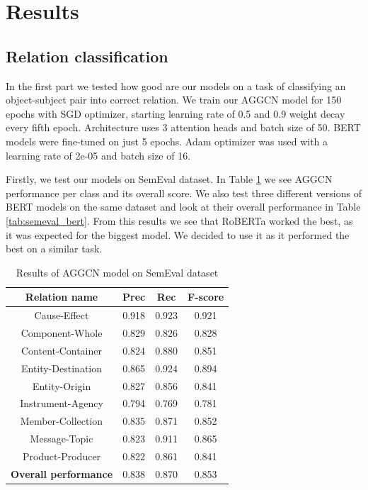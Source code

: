 \documentclass[fleqn,moreauthors,10pt]{ds_report}
\begin{document}

\section{Results}

\subsection{Relation classification}
\par In the first part we tested how good are our models on a task of classifying an object-subject pair into correct relation. We train our AGGCN model for 150 epochs with SGD optimizer, starting learning rate of 0.5 and 0.9 weight decay every fifth epoch. Architecture uses 3 attention heads and batch size of 50. BERT models were fine-tuned on just 5 epochs. Adam optimizer was used with a learning rate of 2e-05 and batch size of 16. 

\par Firstly, we test our models on SemEval dataset. In Table \ref{tab:semeval_aggcn} we see AGGCN performance per class and its overall score. We also test three different versions of BERT models on the same dataset and look at their overall performance in Table \ref{tab:semeval_bert}. From this results we see that RoBERTa worked the best, as it was expected for the biggest model. We decided to use it as it performed the best on a similar task.

\begin{table}[h]
    \centering
    \begin{tabular}{|c|c|c|c|}
        \hline
        \textbf{Relation name} & \textbf{Prec} & \textbf{Rec} & \textbf{F-score} \\ \hline \hline
        Cause-Effect        &  0.918  &  0.923  &  0.921 \\ \hline
        Component-Whole     &  0.829  &  0.826  &  0.828 \\ \hline
        Content-Container   &  0.824  &  0.880  &  0.851 \\ \hline
        Entity-Destination  &  0.865  &  0.924  &  0.894 \\ \hline
        Entity-Origin       &  0.827  &  0.856  &  0.841 \\ \hline
        Instrument-Agency   &  0.794  &  0.769  &  0.781 \\ \hline
        Member-Collection   &  0.835  &  0.871  &  0.852 \\ \hline
        Message-Topic       &  0.823  &  0.911  &  0.865 \\ \hline
        Product-Producer    &  0.822  &  0.861  &  0.841 \\ \hline \hline
        \textbf{Overall performance} & 0.838 & 0.870 & 0.853 \\ \hline
    \end{tabular}
    \caption{Results of AGGCN model on SemEval dataset}
    \label{tab:semeval_aggcn}
\end{table}
\end{document}
